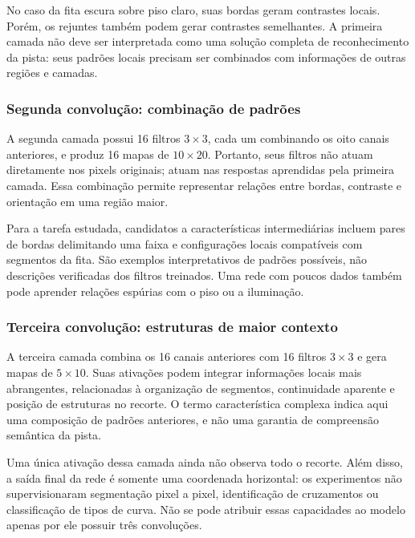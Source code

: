 \documentclass[a4paper,oneside,11pt]{article}
\begin{document}
No caso da fita escura sobre piso claro, suas bordas geram contrastes locais. Porém, os rejuntes também podem gerar contrastes semelhantes. A primeira camada não deve ser interpretada como uma solução completa de reconhecimento da pista: seus padrões locais precisam ser combinados com informações de outras regiões e camadas.

\subsubsection{Segunda convolução: combinação de padrões}
A segunda camada possui 16 filtros $3\times3$, cada um combinando os oito canais anteriores, e produz 16 mapas de $10\times20$. Portanto, seus filtros não atuam diretamente nos pixels originais; atuam nas respostas aprendidas pela primeira camada. Essa combinação permite representar relações entre bordas, contraste e orientação em uma região maior.

Para a tarefa estudada, candidatos a características intermediárias incluem pares de bordas delimitando uma faixa e configurações locais compatíveis com segmentos da fita. São exemplos interpretativos de padrões possíveis, não descrições verificadas dos filtros treinados. Uma rede com poucos dados também pode aprender relações espúrias com o piso ou a iluminação.

\subsubsection{Terceira convolução: estruturas de maior contexto}
A terceira camada combina os 16 canais anteriores com 16 filtros $3\times3$ e gera mapas de $5\times10$. Suas ativações podem integrar informações locais mais abrangentes, relacionadas à organização de segmentos, continuidade aparente e posição de estruturas no recorte. O termo característica complexa indica aqui uma composição de padrões anteriores, e não uma garantia de compreensão semântica da pista.

Uma única ativação dessa camada ainda não observa todo o recorte. Além disso, a saída final da rede é somente uma coordenada horizontal: os experimentos não supervisionaram segmentação pixel a pixel, identificação de cruzamentos ou classificação de tipos de curva. Não se pode atribuir essas capacidades ao modelo apenas por ele possuir três convoluções.
\end{document}
